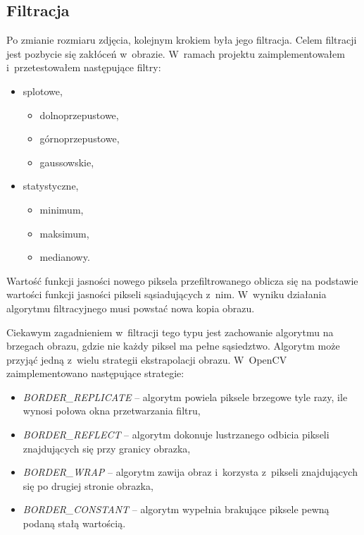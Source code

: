 \subsection{Filtracja}
Po zmianie rozmiaru zdjęcia, kolejnym krokiem była jego filtracja. Celem filtracji jest pozbycie się zakłóceń w~obrazie. W~ramach projektu zaimplementowałem i~przetestowałem następujące filtry:
\begin{itemize}
    \item splotowe,
    \begin{itemize}
        \item dolnoprzepustowe,
        \item górnoprzepustowe,
        \item gaussowskie,
    \end{itemize}
    \item statystyczne,
    \begin{itemize}
        \item minimum,
        \item maksimum,
        \item medianowy.
    \end{itemize}
\end{itemize}

Wartość funkcji jasności nowego piksela przefiltrowanego oblicza się na podstawie wartości funkcji jasności pikseli sąsiadujących z~nim. W~wyniku działania algorytmu filtracyjnego musi powstać nowa kopia obrazu. 

Ciekawym zagadnieniem w~filtracji tego typu jest zachowanie algorytmu na brzegach obrazu, gdzie nie każdy piksel ma pełne sąsiedztwo. Algorytm może przyjąć jedną z~wielu strategii ekstrapolacji obrazu. W~OpenCV~\cite{opencv} zaimplementowano następujące strategie:
\begin{itemize}
    \item \emph{BORDER\_{}REPLICATE} -- algorytm powiela piksele brzegowe tyle razy, ile wynosi połowa okna przetwarzania filtru,
    \item \emph{BORDER\_{}REFLECT} -- algorytm dokonuje lustrzanego odbicia pikseli znajdujących się przy granicy obrazka,
    \item \emph{BORDER\_{}WRAP} -- algorytm zawija obraz i~korzysta z~pikseli znajdujących się po drugiej stronie obrazka,
    \item \emph{BORDER\_{}CONSTANT} -- algorytm wypełnia brakujące piksele pewną podaną stałą wartością.
\end{itemize}


